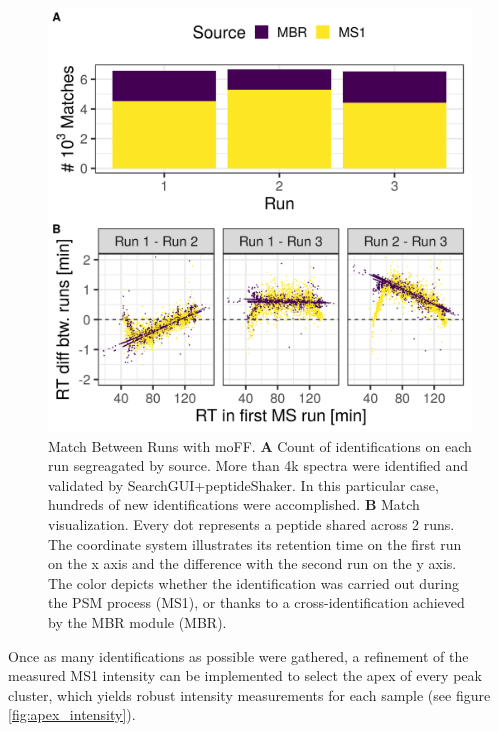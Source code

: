 \documentclass[11pt, a4paper]{report}
\begin{document}
\begin{figure}[H]
\centering
\includegraphics[width=\textwidth]{mbr_combined}
\caption{Match Between Runs with moFF. \textbf{A} Count of identifications on each run segreagated by source. More than 4k spectra were identified and validated by SearchGUI+peptideShaker. In this particular case, hundreds of new identifications were accomplished. \textbf{B} Match visualization. Every dot represents a peptide shared across 2 runs. The coordinate system illustrates its retention time on the first run on the x axis and the difference with the second run on the y axis. The color depicts whether the identification was carried out during the PSM process (MS1), or thanks to a cross-identification achieved by the MBR module (MBR).}
\label{fig:mbr}
\end{figure}

Once as many identifications as possible were gathered, a refinement of the measured MS1 intensity can be implemented to select the apex of every peak cluster, which yields robust intensity measurements for each sample (see figure \ref{fig:apex_intensity}). 
\end{document}
